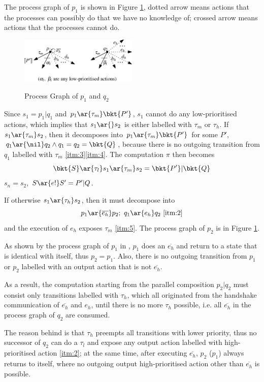  The process graph of $p_1$ is shown in Figure \ref{fig:pgp1q2}, dotted arrow means actions that the processes can possibly do that we have no knowledge of; crossed arrow means actions that the processes cannot do.

  \begin{figure}
    \centering
    \caption{Process Graph of $p_1$ and $q_2$}
    \includegraphics[width = 0.5\textwidth]{images/pgp1q2.eps}
    \label{fig:pgp1q2}
  \end{figure}

  Since $s_1 = p_1|q_1$ and $p_1\ar{\tau_m}\bkt{P'}$, $s_1$ cannot do any low-prioritised actions, which implies that $s_1\ar{}s_2$ is either labelled with $\tau_m$ or $\tau_h$.
  If $s_1\ar{\tau_m}s_2$, then it decomposes into $p_1\ar{\tau_m}\bkt{P'}$ for some $P'$, $q_1\ar{\nil}q_2 \wedge q_1 = q_2 = \bkt{Q}$, because there is no outgoing transition from $q_1$ labelled with $\tau_m$ \ref{itm:3}\ref{itm:4}.
  The computation $\pi$ then becomes
  \[
    \bkt{S} \ar{\tau_l} s_1 \ar{\tau_m} s_2 = \bkt{P'}|\bkt{Q}
  \]
  $s_n = s_2$, $S\ar{e!}S' = P'|Q$.

  If otherwise $s_1\ar{\tau_h}s_2$, then it must decompose into
  \[p_1\ar{\overline{e_h}}p_2;\ q_1\ar{e_h}q_2\ \ref{itm:2}\]
  and the execution of $e_h$ exposes $\tau_m$ \ref{itm:5}.
  The process graph of $p_2$ is in Figure \ref{fig:pgp1q2}.

  As shown by the process graph of $p_1$ in , $p_1$ does an $\overline{e_h}$ and return to a state that is identical with itself, thus $p_2=p_1$.
  Also, there is no outgoing transition from $p_1$ or $p_2$ labelled with an output action that is not $\overline{e_h}$.

  As a result, the computation starting from the parallel composition $p_2 | q_2$ must consist only transitions labelled with $\tau_h$, which all originated from the handshake communication of $\overline{e_h}$ and $e_h$, until there is no more $\tau_h$ possible, i.e. all $\overline{e_h}$ in the process graph of $q_2$ are consumed.

  The reason behind is that $\tau_h$ preempts all transitions with lower priority, thus no successor of $q_2$ can do a $\tau_l$ and expose any output action labelled with high-prioritised action \ref{itm:2}; at the same time, after executing $\overline{e_h}$, $p_2$ ($p_1$) always returns to itself, where no outgoing output high-prioritised action other than $\overline{e_h}$ is possible.


